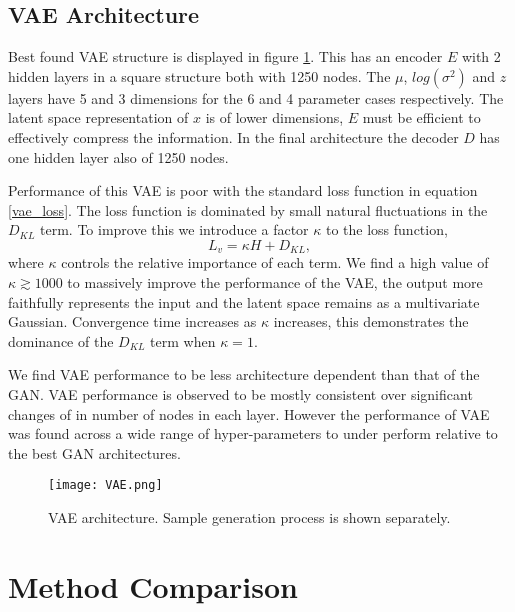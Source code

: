 \documentclass{article}
\begin{document}
    \subsection{VAE Architecture}
        
        Best found VAE structure is displayed in figure \ref{VAE-diagram}. This has an encoder $E$ with 2 hidden layers in a square structure both with 1250 nodes. The $\mu$, $log(\sigma^2)$ and $z$ layers have 5 and 3 dimensions for the 6 and 4 parameter cases respectively. The latent space representation of $x$ is of lower dimensions, $E$ must be efficient to effectively compress the information. In the final architecture the decoder $D$ has one hidden layer also of 1250 nodes. 
        
        Performance of this VAE is poor with the standard loss function in equation \ref{vae_loss}. The loss function is dominated by small natural fluctuations in the $D_{KL}$ term. To improve this we introduce a factor $\kappa$ to the loss function,
        \begin{equation}\label{vae_loss_improved}
            L_v = \kappa H + D_{KL},
        \end{equation}
        where $\kappa$ controls the relative importance of each term. We find a high value of $\kappa \gtrsim 1000$ to massively improve the performance of the VAE, the output more faithfully represents the input and the latent space remains as a multivariate Gaussian. Convergence time increases as $\kappa$ increases, this demonstrates the dominance of the $D_{KL}$ term when $\kappa = 1$. 
    
        We find VAE performance to be less architecture dependent than that of the GAN. VAE performance is observed to be mostly consistent over significant changes of in number of nodes in each layer. However the performance of VAE was found across a wide range of hyper-parameters to under perform relative to the best GAN architectures.

        \begin{figure}[h!]
        \centering
        \texttt{[image: VAE.png]}
        \caption{VAE architecture. Sample generation process is shown separately.}
        \label{VAE-diagram}
        \end{figure}
    

\section{Method Comparison}\label{comparison}
    
\end{document}
